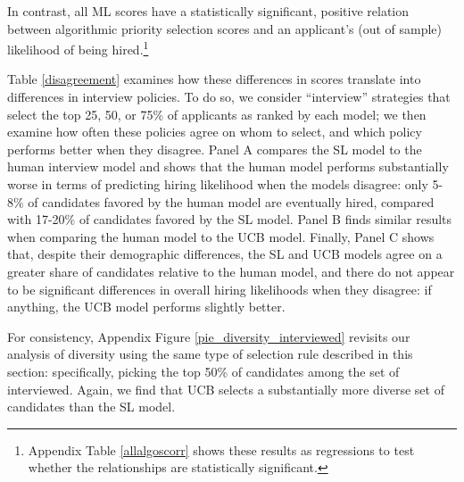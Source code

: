\documentclass[crop,noquery,editorname,historyrev,nosurname,runningno,sepcount]{RESTUD}
\begin{document}
In contrast, all ML scores have a statistically significant, positive relation between algorithmic priority selection scores and an applicant's (out of sample) likelihood of being hired.\footnote{ Appendix Table \ref{allalgoscorr} shows these results as regressions to test whether the relationships are statistically significant.} 

Table \ref{disagreement} examines how these differences in scores translate into differences in interview policies.  To do so, we consider ``interview'' strategies that select the top 25, 50, or 75\% of applicants as ranked by each model; we then examine how often these policies agree on whom to select, and which policy performs better when they disagree.  Panel A compares the SL model to the human interview model and shows that the human model performs substantially worse in terms of predicting hiring likelihood when the models disagree: only 5-8\% of candidates favored by the human model are eventually hired, compared with 17-20\% of candidates favored by the SL model.  Panel B finds similar results when comparing the human model to the UCB model.  Finally, Panel C shows that, despite their demographic differences, the SL and UCB models agree on a greater share of candidates relative to the human model, and there do not appear to be significant differences in overall hiring likelihoods when they disagree: if anything, the UCB model performs slightly better.  

For consistency, Appendix Figure \ref{pie_diversity_interviewed} revisits our analysis of diversity using the same type of selection rule described in this section: specifically, picking the top 50\% of candidates among the set of interviewed.  Again, we find that UCB selects a substantially more diverse set of candidates than the SL model.  

\end{document}

